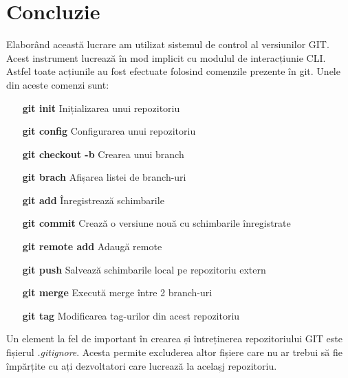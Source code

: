 \section*{Concluzie}

Elaborând această lucrare am utilizat sistemul de control al versiunilor GIT. Acest instrument lucrează în mod implicit cu modulul de interacțiunie CLI. Astfel toate acțiunile 
au fost efectuate folosind comenzile prezente în git. Unele din aceste comenzi sunt:
\begin{enumerate}[leftmargin=4cm]
\item [\textbf{git init}] Inițializarea unui repozitoriu
\item [\textbf{git config}] Configurarea unui repozitoriu
\item [\textbf{git checkout -b}] Crearea unui branch
\item [\textbf{git brach}] Afișarea listei de branch-uri
\item [\textbf{git add}] Înregistrează schimbarile
\item [\textbf{git commit}] Crează o versiune nouă cu schimbarile înregistrate
\item [\textbf{git remote add}] Adaugă remote
\item [\textbf{git push}] Salvează schimbarile local pe repozitoriu extern
\item [\textbf{git merge}] Execută merge între 2 branch-uri
\item [\textbf{git tag}] Modificarea tag-urilor din acest repozitoriu
\end{enumerate}
Un element la fel de important în crearea și întreținerea repozitoriului GIT este fișierul \textit{.gitignore}. Acesta permite excluderea altor fișiere care nu ar trebui să fie împărțite cu ați dezvoltatori care lucrează la acelașj repozitoriu.

\clearpage